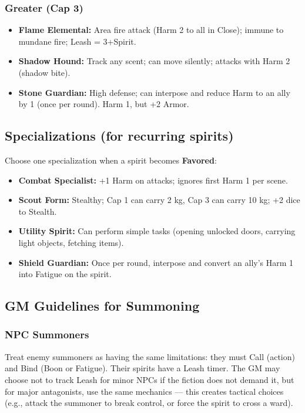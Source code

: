 \subsubsection{Greater (Cap 3)}

\begin{itemize}
  \item \textbf{Flame Elemental:} Area fire attack (Harm 2 to all in Close); immune to mundane fire; Leash = 3+Spirit.
  \item \textbf{Shadow Hound:} Track any scent; can move silently; attacks with Harm 2 (shadow bite).
  \item \textbf{Stone Guardian:} High defense; can interpose and reduce Harm to an ally by 1 (once per round). Harm 1, but +2 Armor.
\end{itemize}

\subsection{Specializations (for recurring spirits)}

Choose one specialization when a spirit becomes \textbf{Favored}:
\begin{itemize}
  \item \textbf{Combat Specialist:} +1 Harm on attacks; ignores first Harm 1 per scene.
  \item \textbf{Scout Form:} Stealthy; Cap 1 can carry 2 kg, Cap 3 can carry 10 kg; +2 dice to Stealth.
  \item \textbf{Utility Spirit:} Can perform simple tasks (opening unlocked doors, carrying light objects, fetching items).
  \item \textbf{Shield Guardian:} Once per round, interpose and convert an ally's Harm 1 into Fatigue on the spirit.
\end{itemize}

\subsection{GM Guidelines for Summoning}

\subsubsection{NPC Summoners}
Treat enemy summoners as having the same limitations: they must Call (action) and Bind (Boon or Fatigue). Their spirits have a Leash timer. The GM may choose not to track Leash for minor NPCs if the fiction does not demand it, but for major antagonists, use the same mechanics --- this creates tactical choices (e.g., attack the summoner to break control, or force the spirit to cross a ward).

